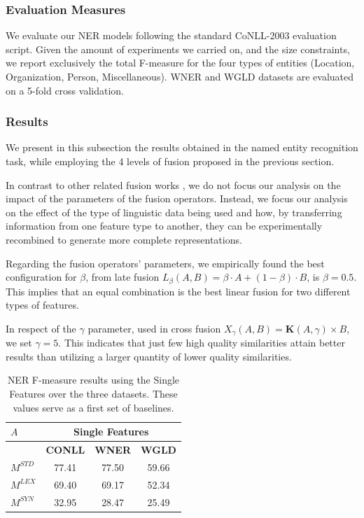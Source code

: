 \documentclass{llncs}
\begin{document}
\subsubsection{Evaluation Measures}
We evaluate our NER models following the standard CoNLL-2003 evaluation script. Given the amount of experiments we carried on, and the size constraints, we report exclusively the total F-measure for the four types of entities (Location, Organization, Person, Miscellaneous). WNER and WGLD datasets are evaluated on a 5-fold cross validation.

\subsubsection{Results}
We present in this subsection the results obtained in the named entity recognition task, while employing the 4 levels of fusion proposed in the previous section.

In contrast to other related fusion works \cite{Ah-PineCC15,ClinchantAC11,GialampoukidisM16}, we do not focus our analysis on the impact of the parameters of the fusion operators. Instead, we focus our analysis on the effect of the type of linguistic data being used and how, by transferring information from one feature type to another, they can be experimentally recombined to generate more complete representations.

Regarding the fusion operators' parameters, we empirically found the best configuration for $\beta$, from late fusion $L_\beta(A,B) = \beta \cdot A + (1 - \beta)\cdot B$, is $\beta=0.5$. This implies that an equal combination is the best linear fusion for two different types of features.

In respect of the $\gamma$ parameter, used in cross fusion $X_{\gamma}(A,B) = \mathbf{K}(A,\gamma) \times B$, we set $\gamma=5$. This indicates that just few high quality similarities attain better results than utilizing a larger quantity of lower quality similarities.

\begin{table}[!tbp]
\centering
\caption{NER F-measure results using the Single Features over the three datasets. These values serve as a first set of baselines. }
\label{tab:ner-blines}
\begin{tabular}{@{}lccc@{}}
\toprule
$A$                           & \multicolumn{3}{c}{\textbf{Single Features}} \\ \midrule
                & \textbf{CONLL}    & \textbf{WNER}     & \textbf{WGLD}    \\ \cmidrule{2-4}
$M^{\scriptscriptstyle STD}$                        & 77.41    & 77.50    & 59.66   \\
$M^{\scriptscriptstyle LEX}$                       & 69.40    & 69.17    & 52.34   \\
$M^{\scriptscriptstyle SYN}$                        & 32.95    & 28.47    & 25.49   \\ \bottomrule
\end{tabular}

\end{table}
\end{document}
